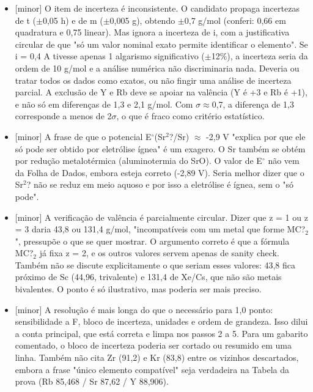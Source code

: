\documentclass{article}%
\begin{document}
\begin{itemize}%
\item%
{[}minor{]} O item de incerteza é inconsistente. O candidato propaga incertezas de t ($\pm$0,05 h) e de m ($\pm$0,005 g), obtendo $\pm$0,7 g/mol (conferi: 0,66 em quadratura e 0,75 linear). Mas ignora a incerteza de i, com a justificativa circular de que "só um valor nominal exato permite identificar o elemento". Se i = 0,4 A tivesse apenas 1 algarismo significativo ($\pm$12\%), a incerteza seria da ordem de 10 g/mol e a análise numérica não discriminaria nada. Deveria ou tratar todos os dados como exatos, ou não fingir uma análise de incerteza parcial. A exclusão de Y e Rb deve se apoiar na valência (Y é +3 e Rb é +1), e não só em diferenças de 1,3 e 2,1 g/mol. Com $\sigma$$\approx$0,7, a diferença de 1,3 corresponde a menos de 2$\sigma$, o que é fraco como critério estatístico.%
\item%
{[}minor{]} A frase de que o potencial E$^\circ$(Sr$^2$?/Sr) $\approx$ -2,9 V "explica por que ele só pode ser obtido por eletrólise ígnea" é um exagero. O Sr também se obtém por redução metalotérmica (aluminotermia do SrO). O valor de E$^\circ$ não vem da Folha de Dados, embora esteja correto (-2,89 V). Seria melhor dizer que o Sr$^2$? não se reduz em meio aquoso e por isso a eletrólise é ígnea, sem o "só pode".%
\item%
{[}minor{]} A verificação de valência é parcialmente circular. Dizer que z = 1 ou z = 3 daria 43,8 ou 131,4 g/mol, "incompatíveis com um metal que forme MC?$_{2}$", pressupõe o que se quer mostrar. O argumento correto é que a fórmula MC?$_{2}$ já fixa z = 2, e os outros valores servem apenas de sanity check. Também não se discute explicitamente o que seriam esses valores: 43,8 fica próximo de Sc (44,96, trivalente) e 131,4 de Xe/Cs, que não são metais bivalentes. O ponto é só ilustrativo, mas poderia ser mais preciso.%
\item%
{[}minor{]} A resolução é mais longa do que o necessário para 1,0 ponto: sensibilidade a F, bloco de incerteza, unidades e ordem de grandeza. Isso dilui a conta principal, que está correta e limpa nos passos 2 a 5. Para um gabarito comentado, o bloco de incerteza poderia ser cortado ou resumido em uma linha. Também não cita Zr (91,2) e Kr (83,8) entre os vizinhos descartados, embora a frase "único elemento compatível" seja verdadeira na Tabela da prova (Rb 85,468 / Sr 87,62 / Y 88,906).%
\end{itemize}%
\end{document}

